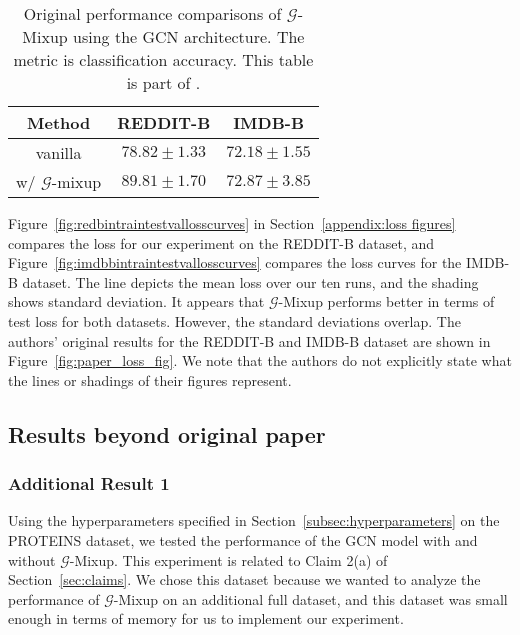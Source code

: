 \begin{table}[h]
    \centering
    \begin{tabular}{c|cc}
        Method & REDDIT-B & IMDB-B \\
        \hline
        vanilla & $78.82 \pm 1.33$ & $72.18 \pm 1.55$ \\
        w/ $\mathcal{G}$-mixup & $\mathbf{89.81 \pm 1.70}$ & $\mathbf{72.87 \pm 3.8}5$ \\
    \end{tabular}
    \caption{Original performance comparisons of $\mathcal{G}$-Mixup using the GCN architecture. The metric is classification accuracy. This table is part of \cite[Table 2]{Han:2022}.}
    \label{tab:table-2-copy}
\end{table}

\vspace{1em}


Figure~\ref{fig:redbintraintestvallosscurves} in Section~\ref{appendix:loss figures} compares the loss for our experiment on the REDDIT-B dataset, and Figure~\ref{fig:imdbbintraintestvallosscurves} compares the loss curves for the IMDB-B dataset. The line depicts the mean loss over our ten runs, and the shading shows standard deviation. It appears that $\mathcal{G}$-Mixup performs better in terms of test loss for both datasets. However, the standard deviations overlap. The authors' original results for the REDDIT-B and IMDB-B dataset are shown in Figure~\ref{fig:paper_loss_fig}. We note that the authors do not explicitly state what the lines or shadings of their figures represent.



\subsection{Results beyond original paper}

\subsubsection{Additional Result 1}\label{section:proteins}

Using the hyperparameters specified in Section~\ref{subsec:hyperparameters} on the PROTEINS dataset, we tested the performance of the GCN model with and without $\mathcal{G}$-Mixup. This experiment is related to Claim 2(a) of Section~\ref{sec:claims}. We chose this dataset because we wanted to analyze the performance of $\mathcal{G}$-Mixup on an additional full dataset, and this dataset was small enough in terms of memory for us to implement our experiment.
\\

